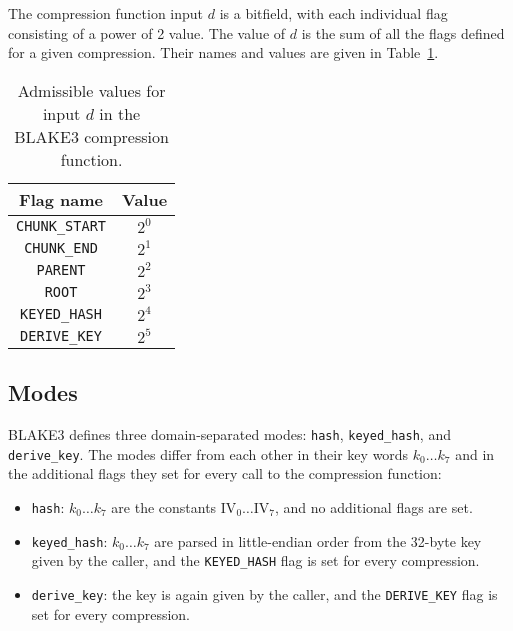\documentclass[12pt,notitlepage,a4paper]{article}
\newcommand{\IV}{\text{IV}}
\begin{document}
The compression function input $d$ is a bitfield, with each individual flag consisting of a power of 2 value. The value of $d$ is the sum of all the flags defined for a given
compression. Their names and values are given in Table~\ref{tab:flags}.
\begin{table}
  \centering
  \caption{Admissible values for input $d$ in the BLAKE3 compression function.}%
  \label{tab:flags}
  \begin{tabular}{cc}
    \toprule
    Flag name             & Value \\ \midrule
    \texttt{CHUNK\_START} & $2^0$ \\
    \texttt{CHUNK\_END}   & $2^1$ \\
    \texttt{PARENT}       & $2^2$ \\
    \texttt{ROOT}         & $2^3$ \\
    \texttt{KEYED\_HASH}  & $2^4$ \\
    \texttt{DERIVE\_KEY}  & $2^5$ \\
    \bottomrule
  \end{tabular}
\end{table}

\subsection{Modes}\label{sec:modes}

BLAKE3 defines three domain-separated modes: \texttt{hash},
\texttt{keyed\_hash}, and \texttt{derive\_key}. The modes differ from each
other in their key words $k_{0} \ldots k_{7}$ and in the additional flags they
set for every call to the compression function:

\begin{itemize}
  \item \texttt{hash}: $k_{0} \ldots k_{7}$ are the constants $\IV_0 \ldots \IV_7$, and no additional flags are set. 
  \item \texttt{keyed\_hash}: $k_{0} \ldots k_{7}$ are parsed in little-endian order from the 32-byte key given by the caller, and the \texttt{KEYED\_HASH} flag is set for every compression.
  \item \texttt{derive\_key}: the key is again given by the caller, and the \texttt{DERIVE\_KEY} flag is set for every compression.
\end{itemize}
\end{document}
